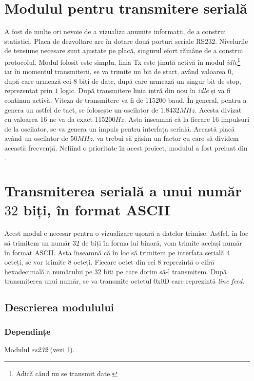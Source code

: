 \documentclass[12pt,twoside,a4paper,fleqn]{book}
\theoremstyle{definition}
\begin{document}
\section{Modulul pentru transmitere serială}
\label{transmitere_seriala}
A fost de multe ori nevoie de a vizualiza anumite informații, de a construi statistici. Placa de dezvoltare are în dotare două porturi seriale RS232. Nivelurile de tensiune necesare sunt ajustate pe placă, singurul efort rămâne de a construi protocolul. Modul folosit este simplu, linia Tx este ținută activă în modul \emph{idle}\footnote{Adică când nu se transmit date.} iar în momentul transmiterii, se va trimite un bit de start, având valoarea $0$, după care urmează cei $8$ biți de date, după care urmează un singur bit de stop, reprezentat prin $1$ logic. După transmitere linia intră din nou în \emph{idle} și va fi continuu activă. Viteza de transmitere va fi de $115200$ baud. În general, pentru a genera un astfel de tact, se folosește un oscilator de $1.8432MHz$. Acesta divizat cu valoarea $16$ ne va da exact $115200Hz$. Asta înseamnă că la fiecare $16$ impulsuri de la oscilator, se va genera un impuls pentru interfața serială. Această placă având un oscilator de $50MHz$, va trebui să găsim un factor cu care să dividem această frecvență. Nefiind o prioritate în acest proiect, modulul a fost preluat din \cite{fpga4fun}.

\section{Transmiterea serială a unui număr $32$ biți, în format ASCII}
\label{modul_ta}
Acest modul e necesar pentru o vizualizare ușoară a datelor trimise. Astfel, în loc să trimitem un număr $32$ de biți în forma lui binară, vom trimite același număr în format ASCII. Asta înseamnă că în loc să trimitem pe interfața serială $4$ octeți, se vor trimite $8$ octeți. Fiecare octet din cei $8$ reprezintă o cifră hexadecimală a numărului pe $32$ biți pe care dorim să-l transmitem. După transmiterea unui număr, se va transmite octetul 0x0D care reprezintă \emph{line feed}.

\subsection{Descrierea modulului}
\subsubsection{Dependințe}
Modulul \emph{rs232} (vezi \ref{transmitere_seriala}).
\end{document}
